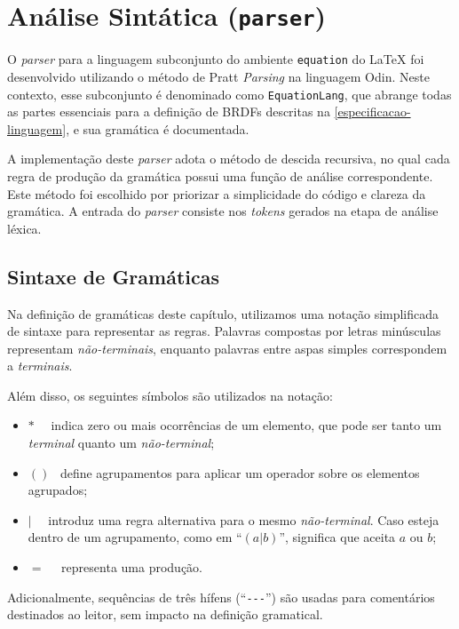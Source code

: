 
\section{Análise Sintática (\texttt{parser})} \label{section-parser}

O \textit{parser} para a linguagem subconjunto do ambiente \verb|equation| do \LaTeX{} foi desenvolvido utilizando o método de Pratt \textit{Parsing} na linguagem Odin. Neste contexto, esse subconjunto é denominado como \texttt{EquationLang}, que abrange todas as partes essenciais para a definição de BRDFs descritas na \autoref{especificacao-linguagem}, e sua gramática é documentada.

A implementação deste \textit{parser} adota o método de descida recursiva, no qual cada regra de produção da gramática possui uma função de análise correspondente. Este método foi escolhido por priorizar a  simplicidade do código e clareza da gramática. A entrada do \textit{parser} consiste nos \textit{tokens} gerados na etapa de análise léxica.


\subsection{Sintaxe de Gramáticas} \label{section-sintatic-grammar-notation}
Na definição de gramáticas deste capítulo, utilizamos uma notação simplificada de sintaxe para representar as regras. Palavras compostas por letras minúsculas representam \textit{não-terminais}, enquanto palavras entre aspas simples correspondem a \textit{terminais}.

Além disso, os seguintes símbolos são utilizados na notação:
\begin{itemize}
    \item $*$ \ \ indica zero ou mais ocorrências de um elemento, que pode ser tanto um \textit{terminal} quanto um \textit{não-terminal};
    \item $()$ \  define agrupamentos para aplicar um operador sobre os elementos agrupados;
    \item $|$  \ \  introduz uma regra alternativa para o mesmo \textit{não-terminal}. Caso esteja dentro de um agrupamento, como em ``$(a|b)$'', significa que aceita $a$ ou $b$;
    \item $=$ \  \  representa uma produção.
\end{itemize}

Adicionalmente, sequências de três hífens (``\verb|---|'') são usadas para comentários destinados ao leitor, sem impacto na definição gramatical.


